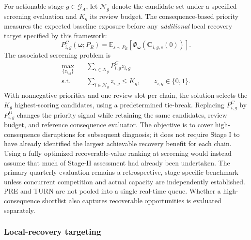 For actionable stage $g\in\mathcal G_A$, let $\mathcal N_g$ denote the candidate set under a specified screening evaluation and $K_g$ its review budget. The consequence-based priority measures the expected baseline exposure before any \emph{additional} local recovery target specified by this framework:
\[
P^C_{i,g}(\boldsymbol\omega;P_R)
=\mathbb E_{s\sim P_R}\!\left[
\Phi_{\boldsymbol\omega}\!\left(\mathbf C_{i,g,s}(0)\right)
\right].
\]
The associated screening problem is
\begin{equation}
\begin{aligned}
\max_{\{z_{i,g}\}}\quad &
\sum_{i\in\mathcal N_g}P^C_{i,g}z_{i,g}\\
\text{s.t.}\quad &
\sum_{i\in\mathcal N_g}z_{i,g}\leq K_g,\qquad
z_{i,g}\in\{0,1\}.
\end{aligned}
\label{eq:stage1_screening}
\end{equation}
With nonnegative priorities and one review slot per chain, the solution selects the $K_g$ highest-scoring candidates, using a predetermined tie-break. Replacing $P^C_{i,g}$ by $P^D_{i,g}$ changes the priority signal while retaining the same candidates, review budget, and reference consequence evaluator. The objective is to cover high-consequence disruptions for subsequent diagnosis; it does not require Stage I to have already identified the largest achievable recovery benefit for each chain. Using a fully optimized recoverable-value ranking at screening would instead assume that much of Stage-II assessment had already been undertaken. The primary quarterly evaluation remains a retrospective, stage-specific benchmark unless concurrent competition and actual capacity are independently established. PRE and TURN are not pooled into a single real-time queue. Whether a high-consequence shortlist also captures recoverable opportunities is evaluated separately.

\subsubsection{Local-recovery targeting}

